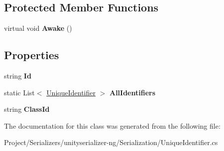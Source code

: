 \subsection*{Protected Member Functions}
\begin{DoxyCompactItemize}
\item 
\mbox{\label{class_unique_identifier_adc29ef30266f6ac51f9489ce21d0f816}} 
virtual void {\bfseries Awake} ()
\end{DoxyCompactItemize}
\subsection*{Properties}
\begin{DoxyCompactItemize}
\item 
\mbox{\label{class_unique_identifier_a5ba479bcdc803e239625d2b699695451}} 
string {\bfseries Id}
\item 
\mbox{\label{class_unique_identifier_a440112bdfcc657532dfdfafc6f6d9387}} 
static List$<$ \hyperlink{class_unique_identifier}{Unique\+Identifier} $>$ {\bfseries All\+Identifiers}
\item 
\mbox{\label{class_unique_identifier_aa02e26cc7965fbe902f0309a2a69ad9d}} 
string {\bfseries Class\+Id}
\end{DoxyCompactItemize}


The documentation for this class was generated from the following file\+:\begin{DoxyCompactItemize}
\item 
Project/\+Serializers/unityserializer-\/ng/\+Serialization/Unique\+Identifier.\+cs\end{DoxyCompactItemize}
